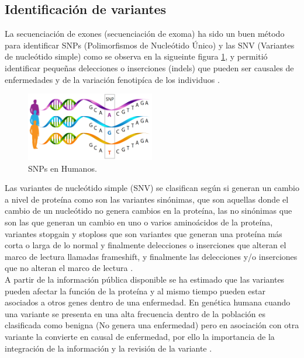 \subsection{Identificación de variantes}

La secuenciación de exones (secuenciación de exoma) ha sido un buen método para identificar SNPs (Polimorfismos de Nucleótido Único) y las SNV (Variantes de nucleótido simple) como se observa en la sigueinte figura \ref{fig:snp}, y permitió identificar pequeñas delecciones o inserciones (indels) que pueden  ser  causales de enfermedades y de la variación fenotipíca de los individuos \cite{Deng2011,Wenger2017}.

\begin{figure}[h!] 
	\centering
	\includegraphics[width=0.5\textwidth]{Estado/snp}
	\caption{SNPs en Humanos.} \label{fig:snp}
\end{figure}

Las variantes de nucleótido simple (SNV) se clasifican según si generan un cambio a nivel de proteína como son las variantes sinónimas, que son aquellas donde el cambio de un nucleótido no genera cambios en la proteína, las no sinónimas que son las que generan un cambio en uno o varios aminoácidos de la proteína, variantes stopgain y stoploss que son variantes que generan una proteína más corta o larga de lo normal y finalmente delecciones o inserciones que alteran el marco de lectura llamadas frameshift, y finalmente las delecciones y/o inserciones que no alteran el marco de lectura \cite{Liu2016}.\\   

A partir de la información pública disponible se ha estimado que las variantes pueden afectar la función de la proteína y al mismo tiempo pueden estar asociados a otros genes dentro de una enfermedad. En genética humana cuando una variante se presenta en una alta frecuencia dentro de la población es clasificada como benigna (No genera una enfermedad) pero en asociación con otra variante la convierte en causal de enfermedad, por ello la importancia de la integración de la información y la revisión de la variante \cite{Shendure2016}.\\


